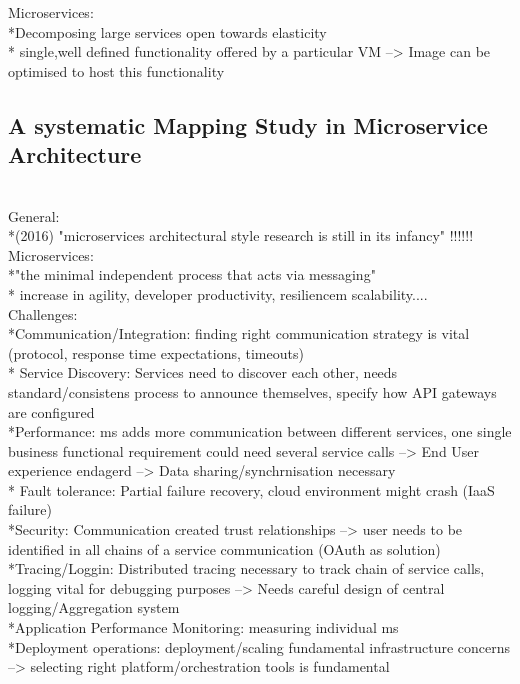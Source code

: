 Microservices:\\
*Decomposing large services open towards elasticity\\
* single,well defined functionality  offered by a particular VM --> Image can be optimised to host this functionality\\

\subsection{A systematic Mapping Study in Microservice Architecture}
\cite{SystematicMappingStudyMicroservice} \\

General:\\
*(2016) "microservices architectural style research is still in its infancy" !!!!!!\\

Microservices:\\
*"the minimal independent process that acts via messaging"\\
* increase in agility, developer productivity, resiliencem scalability....\\


Challenges:\\
*Communication/Integration: finding right communication strategy is vital (protocol, response time expectations, timeouts)\\
* Service Discovery: Services need to discover each other, needs standard/consistens process to announce themselves, specify how API gateways are configured\\
*Performance: ms adds more communication between different services, one single business functional requirement could need several service calls --> End User experience endagerd --> Data sharing/synchrnisation necessary\\
* Fault tolerance: Partial failure recovery, cloud environment might crash (IaaS failure)\\
*Security: Communication created trust relationships --> user needs to be identified in all chains of a service communication (OAuth as solution)\\
*Tracing/Loggin: Distributed tracing necessary to track chain of service calls, logging vital for debugging purposes --> Needs careful design of central logging/Aggregation system\\
*Application Performance Monitoring: measuring individual ms\\
*Deployment operations: deployment/scaling fundamental infrastructure concerns --> selecting right platform/orchestration tools is fundamental\\


